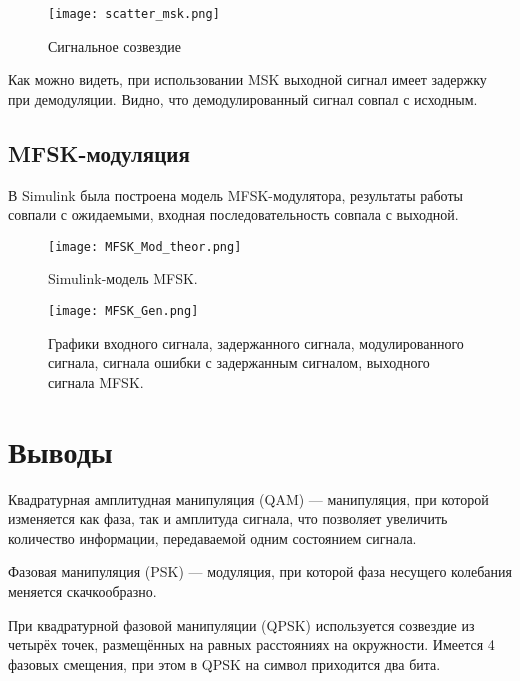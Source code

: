 \begin{figure}[H]
	\begin{center}
		\texttt{[image: scatter\_msk.png]}
		\caption{Сигнальное созвездие} %
		\label{scatter_msk} %
	\end{center}
\end{figure}

Как можно видеть, при использовании MSK выходной сигнал имеет задержку при демодуляции.
Видно, что демодулированный сигнал совпал с исходным.


\subsection{MFSK-модуляция}

В Simulink была построена модель MFSK-модулятора, результаты работы совпали с ожидаемыми, входная последовательность совпала с выходной.
\begin{figure}[H]
	\begin{center}
		\texttt{[image: MFSK\_Mod\_theor.png]}
		\caption{Simulink-модель MFSK.} %
		\label{MFSK_Mod_theor} %
	\end{center}
\end{figure}

\begin{figure}[H]
	\begin{center}
		\texttt{[image: MFSK\_Gen.png]}
		\caption{Графики входного сигнала, задержанного сигнала, модулированного сигнала, сигнала ошибки с задержанным сигналом, выходного сигнала MFSK.} %
		\label{MFSK_Gen} %
	\end{center}
\end{figure}
  
 
\section{Выводы}

Квадратурная амплитудная манипуляция (QAM) — манипуляция, при которой изменяется как фаза, так и амплитуда сигнала, что позволяет увеличить количество информации, передаваемой одним состоянием сигнала. 

Фазовая манипуляция (PSK) — модуляция, при которой фаза несущего колебания меняется скачкообразно. 

При квадратурной фазовой манипуляции (QPSK) используется созвездие из четырёх точек, размещённых на равных расстояниях на окружности. Имеется 4 фазовых смещения, при этом в QPSK на символ приходится два бита. 


